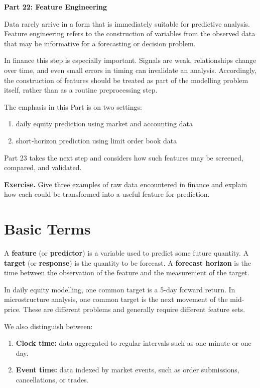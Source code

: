 \documentclass[11pt]{article}
\newcommand{\answerlines}[1]{\vspace{#1\baselineskip}}
\begin{document}
\begin{center}
{\Large \textbf{Part 22: Feature Engineering}}
\end{center}

Data rarely arrive in a form that is immediately suitable for predictive
analysis. Feature engineering refers to the construction of variables from the
observed data that may be informative for a forecasting or decision problem.

In finance this step is especially important. Signals are weak, relationships
change over time, and even small errors in timing can invalidate an analysis.
Accordingly, the construction of features should be treated as part of the
modelling problem itself, rather than as a routine preprocessing step.

The emphasis in this Part is on two settings:

\begin{enumerate}
  \item daily equity prediction using market and accounting data
  \item short-horizon prediction using limit order book data
\end{enumerate}

Part 23 takes the next step and considers how such features may be screened,
compared, and validated.

\textbf{Exercise.} Give three examples of raw data encountered in finance and
explain how each could be transformed into a useful feature for prediction.

\answerlines{6}

\newpage

\section*{Basic Terms}

A \textbf{feature} (or \textbf{predictor}) is a variable used to predict some
future quantity. A \textbf{target} (or \textbf{response}) is the quantity to be
forecast. A \textbf{forecast horizon} is the time between the observation of
the feature and the measurement of the target.

In daily equity modelling, one common target is a 5-day forward return. In
microstructure analysis, one common target is the next movement of the
mid-price. These are different problems and generally require different feature
sets.

We also distinguish between:

\begin{enumerate}
  \item \textbf{Clock time:} data aggregated to regular intervals such as one
  minute or one day.
  \item \textbf{Event time:} data indexed by market events, such as order
  submissions, cancellations, or trades.
\end{enumerate}
\end{document}
